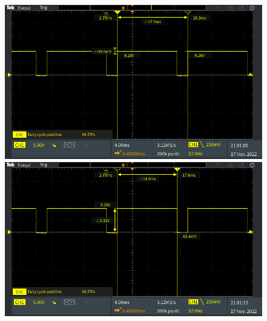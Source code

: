 \begin{figure}[tbh]
	\centering
	\begin{minipage}{.496\textwidth}
		\includegraphics[width=\linewidth]{./ImageFiles/Laboratorio 5/TEK00014.PNG}
	\end{minipage}
	\begin{minipage}{.496\textwidth}
		\includegraphics[width=\linewidth]{./ImageFiles/Laboratorio 5/TEK00015.PNG}
	\end{minipage}
	\caption{}
	\label{fig:circuito_3_scope}
\end{figure}